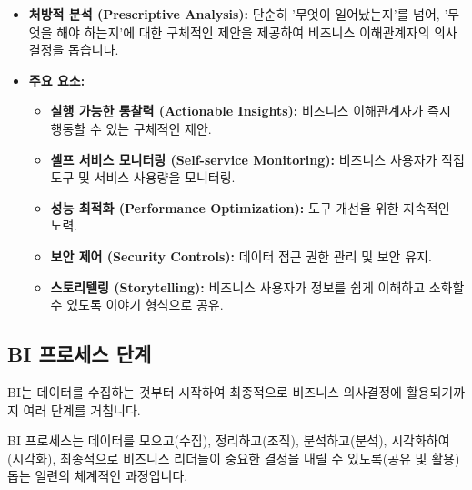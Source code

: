 \documentclass[11pt,a4paper]{article}
\theoremstyle{definition}
\begin{document}
\begin{itemize}
    \item \textbf{처방적 분석 (Prescriptive Analysis):} 단순히 '무엇이 일어났는지'를 넘어, '무엇을 해야 하는지'에 대한 구체적인 제안을 제공하여 비즈니스 이해관계자의 의사결정을 돕습니다.
    \item \textbf{주요 요소:}
    \begin{itemize}
        \item \textbf{실행 가능한 통찰력 (Actionable Insights):} 비즈니스 이해관계자가 즉시 행동할 수 있는 구체적인 제안.
        \item \textbf{셀프 서비스 모니터링 (Self-service Monitoring):} 비즈니스 사용자가 직접 도구 및 서비스 사용량을 모니터링.
        \item \textbf{성능 최적화 (Performance Optimization):} 도구 개선을 위한 지속적인 노력.
        \item \textbf{보안 제어 (Security Controls):} 데이터 접근 권한 관리 및 보안 유지.
        \item \textbf{스토리텔링 (Storytelling):} 비즈니스 사용자가 정보를 쉽게 이해하고 소화할 수 있도록 이야기 형식으로 공유.
    \end{itemize}
\end{itemize}

\subsection{BI 프로세스 단계}
BI는 데이터를 수집하는 것부터 시작하여 최종적으로 비즈니스 의사결정에 활용되기까지 여러 단계를 거칩니다.

\begin{summarybox}[title=핵심 요약: 데이터에서 의사결정까지]
BI 프로세스는 데이터를 모으고(수집), 정리하고(조직), 분석하고(분석), 시각화하여(시각화), 최종적으로 비즈니스 리더들이 중요한 결정을 내릴 수 있도록(공유 및 활용) 돕는 일련의 체계적인 과정입니다.
\end{summarybox}
\end{document}
